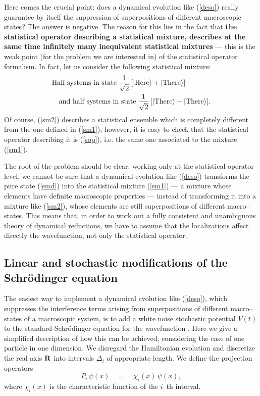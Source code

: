 \documentclass[10pt,a4paper]{article}
\begin{document}
Here comes the crucial point: does a dynamical evolution like
(\ref{deso}) really guarantee by itself the suppression of
superpositions of different macroscopic states? The answer is
negative. The reason for this lies in the fact that {\bf the
statistical operator describing a statistical mixture, describes
at the same time infinitely many inequivalent statistical
mixtures} --- this is the weak point (for the problem we are
interested in) of the statistical operator formalism. In fact, let
us consider the following statistical mixture:
\begin{eqnarray} \label{sm2}
\lefteqn{\makebox{Half systems in state}\;
\frac{1}{\sqrt{2}}\,[|\makebox{Here}\rangle +
|\makebox{There}\rangle]\;} \\
& & \makebox{and half systems in state}\;
\frac{1}{\sqrt{2}}\,[|\makebox{There}\rangle -
|\makebox{There}\rangle].
\end{eqnarray}
Of course, (\ref{sm2}) describes a statistical ensemble which is
completely different from the one defined in (\ref{sm1}); however,
it is easy to check that the statistical operator describing it is
(\ref{sop}), i.e. the same one associated to the mixture
(\ref{sm1}).

The root of the problem should be clear: working only at the
statistical operator level, we cannot be sure that a dynamical
evolution like (\ref{deso}) transforms the pure state (\ref{smd})
into the statistical mixture (\ref{sm1}) --- a mixture whose
elements have definite macroscopic properties --- instead of
transforming it into a mixture like (\ref{sm2}), whose elements
are still superpositions of different macro--states. This means
that, in order to work out a fully consistent and unambiguous
theory of dynamical reductions, we have to assume that the
localizations affect directly the wavefunction, not only the
statistical operator.


\subsection{Linear and stochastic modifications of the Schr\"odinger
equation} \label{sec42}

The easiest way to implement a dynamical evolution like
(\ref{deso}), which suppresses the interference terms arising from
superpositions of different macro--states of a macroscopic system,
is to add a white noise stochastic potential $V(t)$ to the
standard Schr\"odinger equation for the wavefunction \cite{npfs}.
Here we give a simplified description of how this can be achieved,
considering the case of one particle in one dimension. We
disregard the Hamiltonian evolution and discretize the real axis
${\bf R}$ into intervals $\Delta_{i}$ of appropriate length. We
define the projection operators
\begin{equation}
P_{i}\, \psi(x) \quad = \quad \chi_{i}(x)\, \psi(x),
\end{equation}
where $\chi_{i}(x)$ is the characteristic function of the $i$--th
interval.
\end{document}
